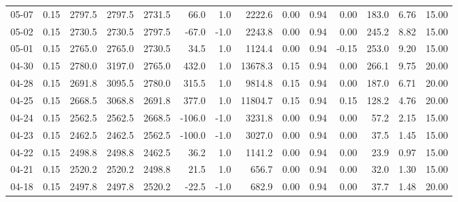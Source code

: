 \begin{threeparttable}
{\begin{tabular}{lrrrrrrrrrrrrr}
  05-07 &     0.15 & 2797.5 & 2797.5 & 2731.5 &       66.0 &                      1.0 &              2222.6 &       0.00 &      0.94 &           0.00 &            183.0 &            6.76 &                  15.00 \\
  05-02 &     0.15 & 2730.5 & 2730.5 & 2797.5 &      -67.0 &                     -1.0 &              2243.8 &       0.00 &      0.94 &           0.00 &            245.2 &            8.82 &                  15.00 \\
  05-01 &     0.15 & 2765.0 & 2765.0 & 2730.5 &       34.5 &                      1.0 &              1124.4 &       0.00 &      0.94 &          -0.15 &            253.0 &            9.20 &                  15.00 \\
  04-30 &     0.15 & 2780.0 & 3197.0 & 2765.0 &      432.0 &                      1.0 &             13678.3 &       0.15 &      0.94 &           0.00 &            266.1 &            9.75 &                  20.00 \\
  04-28 &     0.15 & 2691.8 & 3095.5 & 2780.0 &      315.5 &                      1.0 &              9814.8 &       0.15 &      0.94 &           0.00 &            187.0 &            6.71 &                  20.00 \\
  04-25 &     0.15 & 2668.5 & 3068.8 & 2691.8 &      377.0 &                      1.0 &             11804.7 &       0.15 &      0.94 &           0.15 &            128.2 &            4.76 &                  20.00 \\
  04-24 &     0.15 & 2562.5 & 2562.5 & 2668.5 &     -106.0 &                     -1.0 &              3231.8 &       0.00 &      0.94 &           0.00 &             57.2 &            2.15 &                  15.00 \\
  04-23 &     0.15 & 2462.5 & 2462.5 & 2562.5 &     -100.0 &                     -1.0 &              3027.0 &       0.00 &      0.94 &           0.00 &             37.5 &            1.45 &                  15.00 \\
  04-22 &     0.15 & 2498.8 & 2498.8 & 2462.5 &       36.2 &                      1.0 &              1141.2 &       0.00 &      0.94 &           0.00 &             23.9 &            0.97 &                  15.00 \\
  04-21 &     0.15 & 2520.2 & 2520.2 & 2498.8 &       21.5 &                      1.0 &               656.7 &       0.00 &      0.94 &           0.00 &             32.0 &            1.30 &                  15.00 \\
  04-18 &     0.15 & 2497.8 & 2497.8 & 2520.2 &      -22.5 &                     -1.0 &               682.9 &       0.00 &      0.94 &           0.00 &             37.7 &            1.48 &                  20.00 \\

\end{tabular}}
\end{threeparttable}
